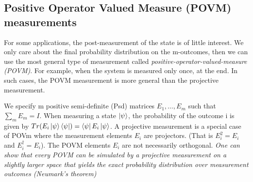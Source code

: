 \subsection{Positive Operator Valued Measure (POVM) measurements}
For some applications, the post-measurement of the state is of little interest. We only care about the final probability distribution 
on the m-outcomes, then we can use the most general type of measurement called \textit{positive-operator-valued-measure (POVM)}. For example,
when the system is measured only once, at the end. In such cases, the POVM measurement is more general than the projective measurement.

We specify m positive semi-definite (Psd) matrices $E_1,\ldots,E_m$ such that $\sum_m E_m=I$. When measuring a state 
$\ket{\psi}$, the probability of the outcome i is given by $Tr(E_i\ket{\psi}\bra{\psi}) = \bra{\psi}E_i\ket{\psi}$. A projective measurement is a special case of POVm where the 
measurement elements $E_i$ are projectors. (That is $E_i^2=E_i$ and $E_i^{\dagger}=E_i$). The POVM elements $E_i$ are not necessarily orthogonal. 
\textit{One can show that every POVM can be simulated by a projective measurement on a slightly larger space that yields the exact probability distribution over measurement outcomes (Neumark's theorem)}

